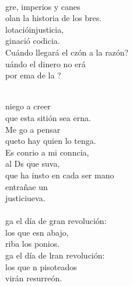\begin{cancion}%
	    \\
	gre, imperios y canes\\
	olan la historia de los bres.\\
	lotacióinjusticia,\\
	ginació codicia.\\
	Cuándo llegará el czón a la razón?\\
	uándo el dinero no erá \\
	por ema de la ? \\\jump\\
	\begin{chorus}%
	 niego a creer\\
	que esta sitión sea erna.\\
	Me go a pensar \\
	queto hay quien lo tenga.\\
	Es conrio a mi conncia,\\
	al Ds que suva,\\
	que ha insto en cada ser mano\\
	entrañae un\\
	justiciueva.   \\
\jump\\
	ga el día de gran revolución:\\
	los que esn abajo,  \\
	riba los ponios.\\
	ga el día de lran revolución:\\
	los que n pisoteados \\
	virán resurreón.\\
	\end{chorus}%

\end{cancion}
